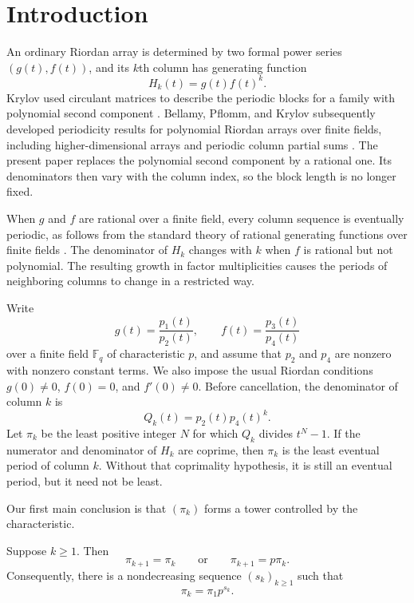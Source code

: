 \section{Introduction}

An ordinary Riordan array is determined by two formal power series
$(g(t),f(t))$, and its $k$th column has generating function
\[
H_k(t)=g(t)f(t)^k.
\]
Krylov used circulant matrices to describe the periodic blocks for a family
with polynomial second component \cite{Krylov2025}. Bellamy, Pflomm, and
Krylov subsequently developed periodicity results for polynomial Riordan
arrays over finite fields, including higher-dimensional arrays and periodic
column partial sums \cite{BellamyPflommKrylov2026}. The present paper replaces
the polynomial second component by a rational one. Its denominators then vary
with the column index, so the block length is no longer fixed.

When $g$ and $f$ are rational over a finite field, every column sequence is
eventually periodic, as follows from the standard theory of rational
generating functions over finite fields \cite{Golomb1967,LidlNiederreiter1997}.
The denominator of $H_k$ changes with $k$ when $f$ is rational but not
polynomial. The resulting growth in factor multiplicities causes the periods
of neighboring columns to change in a restricted way.

Write
\[
g(t)=\frac{p_1(t)}{p_2(t)},
\qquad
f(t)=\frac{p_3(t)}{p_4(t)}
\]
over a finite field $\mathbb F_q$ of characteristic $p$, and assume that
$p_2$ and $p_4$ are nonzero with nonzero constant terms. We also impose the
usual Riordan conditions $g(0)\ne0$, $f(0)=0$, and $f'(0)\ne0$. Before cancellation,
the denominator of column $k$ is
\[
Q_k(t)=p_2(t)p_4(t)^k.
\]
Let $\pi_k$ be the least positive integer $N$ for which $Q_k$ divides
$t^N-1$. If the numerator and denominator of $H_k$ are coprime, then $\pi_k$
is the least eventual period of column $k$. Without that coprimality
hypothesis, it is still an eventual period, but it need not be least.

Our first main conclusion is that $(\pi_k)$ forms a tower controlled by the
characteristic.

\begin{letterthm}\label{thm:intro-period}
Suppose $k\geqslant1$. Then
\[
\pi_{k+1}=\pi_k
\qquad\text{or}\qquad
\pi_{k+1}=p\pi_k.
\]
Consequently, there is a nondecreasing sequence $(s_k)_{k\geqslant1}$ such
that
\[
\pi_k=\pi_1p^{s_k}.
\]
\end{letterthm}

